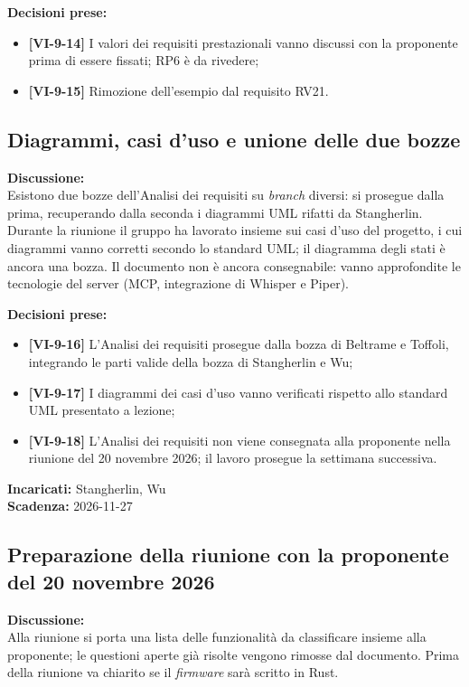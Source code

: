 \documentclass[12pt,a4paper]{article}
\newcommand{\vnum}{9}                     %
\newcommand{\tightlist}{\setlength{\itemsep}{1pt}\setlength{\parskip}{0pt}}
\begin{document}
\textbf{Decisioni prese:}
\begin{itemize}
\tightlist
\item[$\checkmark$] \textbf{[VI-\vnum-14]} I valori dei requisiti prestazionali vanno discussi con la proponente prima di essere fissati; RP6 è da rivedere;
\item[$\checkmark$] \textbf{[VI-\vnum-15]} Rimozione dell'esempio dal requisito RV21.
\end{itemize}

\hypertarget{odg-5}{%
\subsection{Diagrammi, casi d'uso e unione delle due bozze}}
\textbf{Discussione:}\\
Esistono due bozze dell'Analisi dei requisiti su \emph{branch} diversi: si prosegue dalla prima, recuperando dalla seconda i diagrammi UML rifatti da Stangherlin. Durante la riunione il gruppo ha lavorato insieme sui casi d'uso del progetto, i cui diagrammi vanno corretti secondo lo standard UML; il diagramma degli stati è ancora una bozza. Il documento non è ancora consegnabile: vanno approfondite le tecnologie del server (MCP, integrazione di Whisper e Piper).

\textbf{Decisioni prese:}
\begin{itemize}
\tightlist
\item[$\checkmark$] \textbf{[VI-\vnum-16]} L'Analisi dei requisiti prosegue dalla bozza di Beltrame e Toffoli, integrando le parti valide della bozza di Stangherlin e Wu;
\item[$\checkmark$] \textbf{[VI-\vnum-17]} I diagrammi dei casi d'uso vanno verificati rispetto allo standard UML presentato a lezione;
\item[$\checkmark$] \textbf{[VI-\vnum-18]} L'Analisi dei requisiti non viene consegnata alla proponente nella riunione del 20 novembre 2026; il lavoro prosegue la settimana successiva.
\end{itemize}

\textbf{Incaricati:} Stangherlin, Wu\\
\textbf{Scadenza:} 2026-11-27

\hypertarget{odg-6}{%
\subsection{Preparazione della riunione con la proponente del 20 novembre 2026}}
\textbf{Discussione:}\\
Alla riunione si porta una lista delle funzionalità da classificare insieme alla proponente; le questioni aperte già risolte vengono rimosse dal documento. Prima della riunione va chiarito se il \emph{firmware} sarà scritto in Rust.
\end{document}

